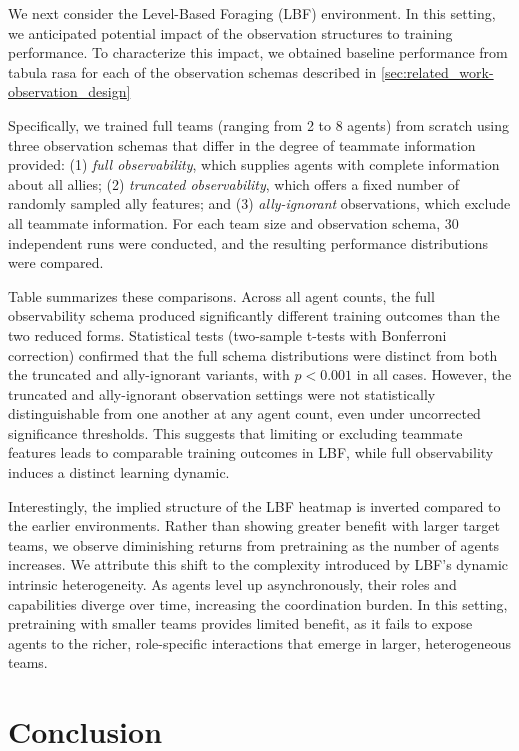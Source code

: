 \documentclass{article}
\begin{document}
We next consider the Level-Based Foraging (LBF) environment. 
In this setting, 
we anticipated potential impact of the observation structures
to 
training performance.
To characterize this impact, 
we obtained baseline performance from tabula rasa
for each of the observation schemas described in 
\ref{sec:related_work-observation_design}

Specifically, we trained full teams 
(ranging from 2 to 8 agents) from scratch using three observation schemas that differ in 
the degree of teammate information provided: (1) \emph{full observability}, which supplies agents with complete information about all allies; (2) \emph{truncated observability}, which offers a fixed number of randomly sampled ally features; and (3) \emph{ally-ignorant} observations, which exclude all teammate information. For each team size and observation schema, 30 independent runs were conducted, and the resulting performance distributions were compared.


Table%
summarizes these comparisons. Across all agent counts, the full observability schema produced significantly different training outcomes than the two reduced forms. Statistical tests (two-sample t-tests with Bonferroni correction) confirmed that the full schema distributions were distinct from both the truncated and ally-ignorant variants, with $p < 0.001$ in all cases. However, the truncated and ally-ignorant observation settings were not statistically distinguishable from one another at any agent count, even under uncorrected significance thresholds. This suggests that limiting or excluding teammate features leads to comparable training outcomes in LBF, while full observability induces a distinct learning dynamic.

Interestingly, the implied structure of the LBF heatmap is inverted compared to the earlier environments. Rather than showing greater benefit with larger target teams, we observe diminishing returns from pretraining as the number of agents increases. We attribute this shift to the complexity introduced by LBF’s dynamic intrinsic heterogeneity. As agents level up asynchronously, their roles and capabilities diverge over time, increasing the coordination burden. In this setting, pretraining with smaller teams provides limited benefit, as it fails to expose agents to the richer, role-specific interactions that emerge in larger, heterogeneous teams.



\section{Conclusion}
\end{document}
